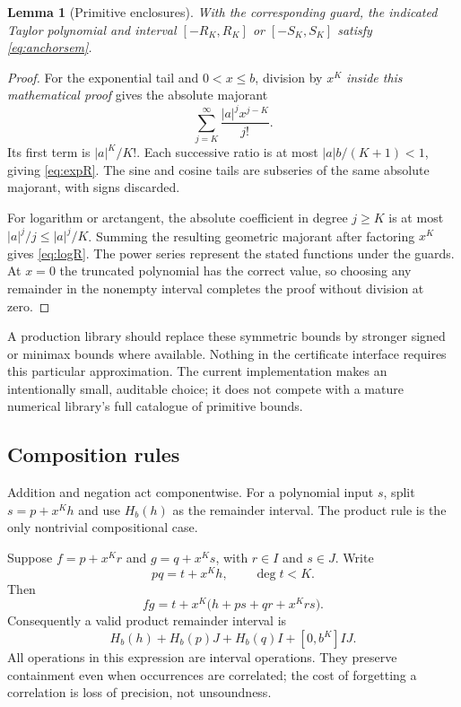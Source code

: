 \documentclass[11pt,a4paper]{article}
\newtheorem{lemma}[theorem]{Lemma}
\theoremstyle{definition}\newtheorem{definition}[theorem]{Definition}
\begin{document}
\begin{lemma}[Primitive enclosures]
With the corresponding guard, the indicated Taylor polynomial and interval
$[-R_K,R_K]$ or $[-S_K,S_K]$ satisfy \eqref{eq:anchorsem}.
\end{lemma}
\begin{proof}
For the exponential tail and $0<x\le b$, division by $x^K$ \emph{inside this
mathematical proof} gives the absolute majorant
\[
 \sum_{j=K}^{\infty}\frac{|a|^jx^{j-K}}{j!}.
\]
Its first term is $|a|^K/K!$. Each successive ratio is at most
$|a|b/(K+1)<1$, giving \eqref{eq:expR}. The sine and cosine tails are
subseries of the same absolute majorant, with signs discarded.

For logarithm or arctangent, the absolute coefficient in degree $j\ge K$ is
at most $|a|^j/j\le |a|^j/K$. Summing the resulting geometric majorant after
factoring $x^K$ gives \eqref{eq:logR}. The power series represent the stated
functions under the guards. At $x=0$ the truncated polynomial has the correct
value, so choosing any remainder in the nonempty interval completes the proof
without division at zero.
\end{proof}

A production library should replace these symmetric bounds by stronger signed
or minimax bounds where available. Nothing in the certificate interface requires
this particular approximation. The current implementation makes an intentionally
small, auditable choice; it does not compete with a mature numerical library's
full catalogue of primitive bounds.

\subsection{Composition rules}

Addition and negation act componentwise. For a polynomial input $s$, split
$s=p+x^Kh$ and use $H_b(h)$ as the remainder interval. The product rule is the
only nontrivial compositional case.

Suppose $f=p+x^Kr$ and $g=q+x^Ks$, with $r\in I$ and $s\in J$. Write
\[
 pq=t+x^Kh,\qquad \deg t<K.
\]
Then
\begin{equation}\label{eq:jetproduct}
 fg=t+x^K\bigl(h+ps+qr+x^Krs\bigr).
\end{equation}
Consequently a valid product remainder interval is
\begin{equation}\label{eq:productinterval}
 H_b(h)+H_b(p)J+H_b(q)I+[0,b^K]IJ.
\end{equation}
All operations in this expression are interval operations. They preserve
containment even when occurrences are correlated; the cost of forgetting a
correlation is loss of precision, not unsoundness.
\end{document}
